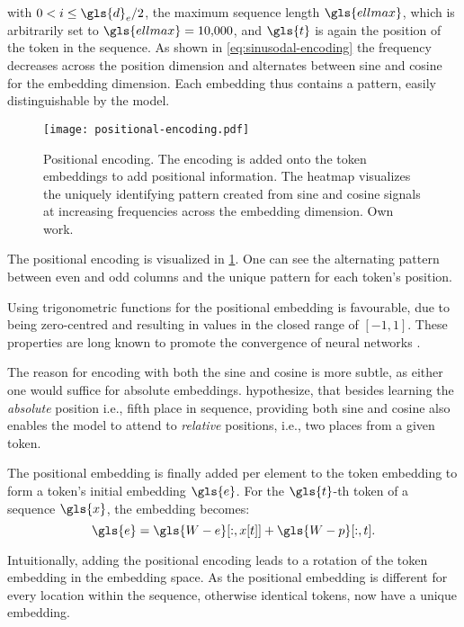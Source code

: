 with $0<i \leq \gls{d}_{e} / 2$, the maximum sequence length $\gls{ellmax}$, which is arbitrarily set to $\gls{ellmax}=10{,}000$, and $\gls{t}$ is again the position of the token in the sequence. As shown in \cref{eq:sinusodal-encoding} the frequency decreases across the position dimension and alternates between sine and cosine for the embedding dimension. Each embedding thus contains a pattern, easily distinguishable by the model.

\begin{figure}[ht]
    \centering
    \texttt{[image: positional-encoding.pdf]}
    \caption[Positional Encoding of Transformer]{Positional encoding. The encoding is added onto the token embeddings to add positional information. The heatmap visualizes the uniquely identifying pattern created from sine and cosine signals at increasing frequencies across the embedding dimension. Own work.}
    \label{fig:positional-embedding}
\end{figure}

The positional encoding is visualized in \cref{fig:positional-embedding}. One can see the alternating pattern between even and odd columns and the unique pattern for each token's position.

Using trigonometric functions for the positional embedding is favourable, due to being zero-centred and resulting in values in the closed range of $[-1,1]$. These properties are long known to promote the convergence of neural networks \autocites[][8-9]{lecunEfficientBackProp2012}[][2]{ioffeBatchNormalizationAccelerating2015}.

The reason for encoding with both the sine and cosine is more subtle, as either one would suffice for absolute embeddings. \textcite[][6]{vaswaniAttentionAllYou2017} hypothesize, that besides learning the \emph{absolute} position i.e., fifth place in sequence, providing both sine and cosine also enables the model to attend to \emph{relative} positions, i.e., two places from a given token.

The positional embedding is finally added per element to the token embedding to form a token's initial embedding $\gls{e}$. For the $\gls{t}$-th token of a sequence $\gls{x}$, the embedding becomes:
\begin{equation}
    \gls{e}=\gls{W-e}[:, x[t]]+\gls{W-p}[:, t].
    \label{eq:positional-embedding}
\end{equation}

Intuitionally, adding the positional encoding leads to a rotation of the token embedding in the embedding space. As the positional embedding is different for every location within the sequence, otherwise identical \glspl{token}, now have a unique embedding.

